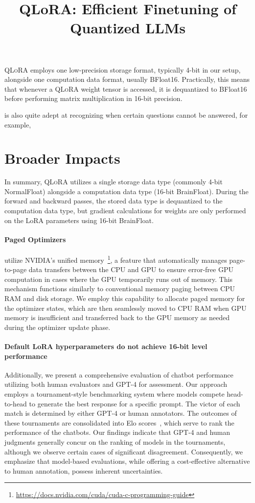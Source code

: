 \title{QLoRA: Efficient Finetuning of Quantized LLMs}
\textsc{QLoRA} employs one low-precision storage format, typically 4-bit in our setup, alongside one computation data format, usually BFloat16. Practically, this means that whenever a \textsc{QLoRA} weight tensor is accessed, it is dequantized to BFloat16 before performing matrix multiplication in 16-bit precision.

is also quite adept at recognizing when certain questions cannot be answered, for example,

\section{Broader Impacts}

In summary, \textsc{QLoRA} utilizes a single storage data type (commonly 4-bit NormalFloat) alongside a computation data type (16-bit BrainFloat). During the forward and backward passes, the stored data type is dequantized to the computation data type, but gradient calculations for weights are only performed on the LoRA parameters using 16-bit BrainFloat.

\paragraph{Paged Optimizers} utilize NVIDIA's unified memory~\footnote{\tiny \url{https://docs.nvidia.com/cuda/cuda-c-programming-guide}}, a feature that automatically manages page-to-page data transfers between the CPU and GPU to ensure error-free GPU computation in cases where the GPU temporarily runs out of memory. This mechanism functions similarly to conventional memory paging between CPU RAM and disk storage. We employ this capability to allocate paged memory for the optimizer states, which are then seamlessly moved to CPU RAM when GPU memory is insufficient and transferred back to the GPU memory as needed during the optimizer update phase.

\paragraph{Default LoRA hyperparameters do not achieve 16-bit level performance}

Additionally, we present a comprehensive evaluation of chatbot performance utilizing both human evaluators and GPT-4 for assessment. Our approach employs a tournament-style benchmarking system where models compete head-to-head to generate the best response for a specific prompt. The victor of each match is determined by either GPT-4 or human annotators. The outcomes of these tournaments are consolidated into Elo scores~\citep{elo1967proposed, elo1978rating}, which serve to rank the performance of the chatbots. Our findings indicate that GPT-4 and human judgments generally concur on the ranking of models in the tournaments, although we observe certain cases of significant disagreement. Consequently, we emphasize that model-based evaluations, while offering a cost-effective alternative to human annotation, possess inherent uncertainties.

